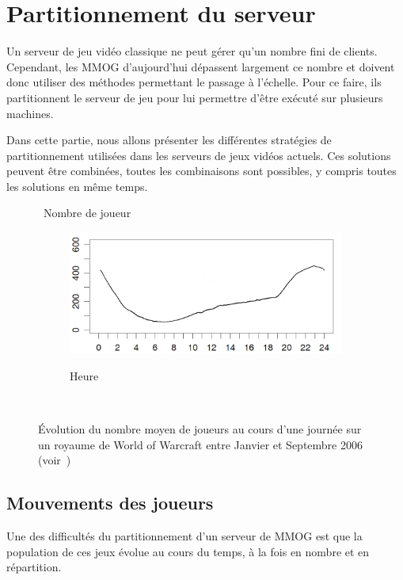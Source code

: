 \section{Partitionnement du serveur}
Un serveur de jeu vidéo classique ne peut gérer qu'un nombre fini de clients.
Cependant, les MMOG d'aujourd'hui dépassent largement ce nombre et doivent donc utiliser des méthodes permettant le passage à l'échelle.
Pour ce faire, ils partitionnent le serveur de jeu pour lui permettre d'être exécuté sur plusieurs machines.

Dans cette partie, nous allons présenter les différentes stratégies de partitionnement utilisées dans les serveurs de jeux vidéos actuels.
Ces solutions peuvent être combinées, toutes les combinaisons sont possibles, y compris toutes les solutions en même temps.

\begin{figure}[b!]
	\centering
	\begin{sideways}\qquad\quad~Nombre de joueur\end{sideways}
	\begin{subfigure}[b]{0.5\textwidth}
		\centering
		\includegraphics[width=\textwidth]{player_day_evol.png}
                
		Heure
	\end{subfigure}
	\\[0.2cm]
	\caption{\'Evolution du nombre moyen de joueurs au cours d'une journée sur un royaume de World of Warcraft entre Janvier et Septembre 2006 (voir~\cite{is_server_consolidation_benefical})}
	\label{fig:player_day_evol}
\end{figure}

\subsection{Mouvements des joueurs}
Une des difficultés du partitionnement d'un serveur de MMOG est que la population de ces jeux évolue au cours du temps, à la fois en nombre et en répartition.


